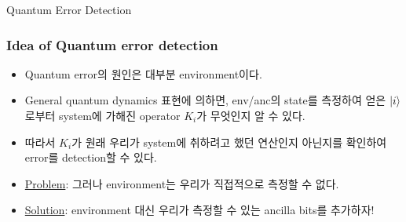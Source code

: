 \documentclass[9pt]{beamer}
\begin{document}
    \begin{section}{Quantum Error Detection}
        \begin{frame}
            \frametitle{Idea of Quantum error detection}
            \begin{itemize}
                \item Quantum error의 원인은 대부분 environment이다.
                \item General quantum dynamics 표현에 의하면, env/anc의 state를 측정하여 얻은 $\ket i$로부터 system에 가해진 operator $K_i$가 무엇인지 알 수 있다.
                \item 따라서 $K_i$가 원래 우리가 system에 취하려고 했던 연산인지 아닌지를 확인하여 error를 detection할 수 있다.
                \vspace{0.5cm}
                \item \underline{Problem}: 그러나 environment는 우리가 직접적으로 측정할 수 없다.
                \item \underline{Solution}: environment 대신 우리가 측정할 수 있는 ancilla bits를 추가하자!
            \end{itemize}
        \end{frame}


\end{section}
\end{document}
